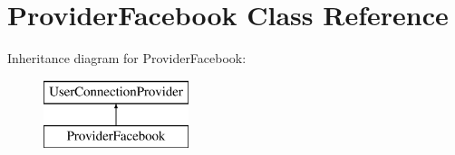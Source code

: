 \hypertarget{class_provider_facebook}{\section{Provider\-Facebook Class Reference}
\label{class_provider_facebook}
}
Inheritance diagram for Provider\-Facebook\-:\begin{figure}[H]
\begin{center}
\leavevmode
\includegraphics[height=2.000000cm]{class_provider_facebook}
\end{center}
\end{figure}
